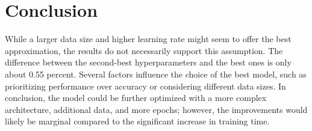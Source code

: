 \documentclass[12pt]{article}
\begin{document}
\section{Conclusion}
While a larger data size and higher learning rate might seem to offer the best approximation, the results do not necessarily support this assumption.
The difference between the second-best hyperparameters and the best ones is only about 0.55 percent.
Several factors influence the choice of the best model, such as prioritizing performance over accuracy or considering different data sizes.
In conclusion, the model could be further optimized with a more complex architecture, additional data, and more epochs; however, the improvements would likely be marginal compared to the significant increase in training time.
\end{document}
